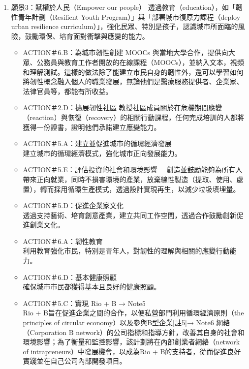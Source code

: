 \documentclass[a4paper,12pt]{article}
\begin{document}
\begin{enumerate}
\begin{enumerate}
\item 願景3：賦權於人民（Empower our people）
\label{sec:org3ed9f13}
透過教育（education），如「韌性青年計劃（Resilient Youth Program）」與「部署城市復原力課程（deploy urban resilience curriculum）」，強化民眾、特別是孩子，認識城市所面臨的風險，鼓勵環保、培育面對衝擊與應變的能力。\\
\begin{itemize}
\item ACTION＃6.B：為城市韌性創建 MOOCs  與當地大學合作，提供向大眾、公務員與教育工作者開放的在線課程（MOOCs），並納入文本，視頻和理解測試。這樣的做法除了能建立市民自身的韌性外，還可以學習如何將韌性概念融入個人的職業發展，無論他們是醫療服務提供者、企業家、法律官員等，都能有所收益。\\
\item ACTION＃2.D：擴展韌性社區  教授社區成員關於在危機期間應變（reaction）與恢復（recovery）的相關行動課程，任何完成培訓的人都將獲得一份證書，證明他們承諾建立應變能力。\\
\item ACTION＃5.A：建立並促進城市的循環經濟發展\\
建立城市的循環經濟模式，強化城市正向發展能力。\\
\item ACTION＃5.E：評估投資的社會和環境影響　  創造並鼓勵能夠為所有人帶來正向就業，同時不損害環境的產業，放棄線性製造（提取、使用、處置），轉而採用循環生產模式，透過設計實現再生，以減少垃圾填埋量。\\
\item ACTION＃5.D：促進企業家文化\\
透過支持藝術、培育創意產業，建立共同工作空間，透過合作鼓勵創新促進創業文化。\\
\item ACTION＃6.A：韌性教育\\
利用教育強化市民，特別是青年人，對韌性的理解與相關的應變行動能力。\\
\item ACTION＃6.D：基本健康照顧\\
確保城市市民都獲得基本且良好的健康照顧。\\
\item ACTION＃5.C：實現 Rio + B → Note5\\
Rio + B旨在促進企業之間的合作，以便私營部門利用循環經濟原則（the principles of circular economy）以及參與B型企業[註5]→ Note6 網絡（Corporation B network）的公司指標和指導方針，改善其自身的社會和環境影響；為了衡量和監控影響，該計劃將在內部創業者網絡（network of intrapreneurs）中發展機會，以成為Rio + B的支持者，從而促進良好實踐並在自己公司內部開發項目。\\

\end{itemize}
\end{enumerate}
\end{enumerate}
\end{document}
